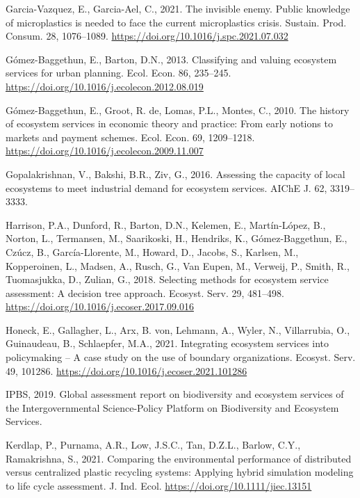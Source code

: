 \documentclass[]{elsarticle} %
\newlength{\cslhangindent}
\newenvironment{CSLReferences}[2] %
 {%
  \setlength{\parindent}{0pt}
  \ifodd #1 \everypar{\setlength{\hangindent}{\cslhangindent}}\ignorespaces\fi
  \ifnum #2 > 0
  \setlength{\parskip}{#2\baselineskip}
  \fi
 }%
 {}
\begin{document}
\begin{CSLReferences}{1}{0}
\leavevmode{}%
Garcia-Vazquez, E., Garcia-Ael, C., 2021. {The invisible enemy. Public knowledge of microplastics is needed to face the current microplastics crisis}. Sustain. Prod. Consum. 28, 1076--1089. \url{https://doi.org/10.1016/j.spc.2021.07.032}

\leavevmode{}%
Gómez-Baggethun, E., Barton, D.N., 2013. {Classifying and valuing ecosystem services for urban planning}. Ecol. Econ. 86, 235--245. \url{https://doi.org/10.1016/j.ecolecon.2012.08.019}

\leavevmode{}%
Gómez-Baggethun, E., Groot, R. de, Lomas, P.L., Montes, C., 2010. {The history of ecosystem services in economic theory and practice: From early notions to markets and payment schemes}. Ecol. Econ. 69, 1209--1218. \url{https://doi.org/10.1016/j.ecolecon.2009.11.007}

\leavevmode{}%
Gopalakrishnan, V., Bakshi, B.R., Ziv, G., 2016. {Assessing the capacity of local ecosystems to meet industrial demand for ecosystem services}. AIChE J. 62, 3319--3333.

\leavevmode{}%
Harrison, P.A., Dunford, R., Barton, D.N., Kelemen, E., Martín-López, B., Norton, L., Termansen, M., Saarikoski, H., Hendriks, K., Gómez-Baggethun, E., Czúcz, B., García-Llorente, M., Howard, D., Jacobs, S., Karlsen, M., Kopperoinen, L., Madsen, A., Rusch, G., Van Eupen, M., Verweij, P., Smith, R., Tuomasjukka, D., Zulian, G., 2018. {Selecting methods for ecosystem service assessment: A decision tree approach}. Ecosyst. Serv. 29, 481--498. \url{https://doi.org/10.1016/j.ecoser.2017.09.016}

\leavevmode{}%
Honeck, E., Gallagher, L., Arx, B. von, Lehmann, A., Wyler, N., Villarrubia, O., Guinaudeau, B., Schlaepfer, M.A., 2021. {Integrating ecosystem services into policymaking -- A case study on the use of boundary organizations}. Ecosyst. Serv. 49, 101286. \url{https://doi.org/10.1016/j.ecoser.2021.101286}

\leavevmode{}%
IPBS, 2019. {Global assessment report on biodiversity and ecosystem services of the Intergovernmental Science-Policy Platform on Biodiversity and Ecosystem Services}.

\leavevmode{}%
Kerdlap, P., Purnama, A.R., Low, J.S.C., Tan, D.Z.L., Barlow, C.Y., Ramakrishna, S., 2021. {Comparing the environmental performance of distributed versus centralized plastic recycling systems: Applying hybrid simulation modeling to life cycle assessment}. J. Ind. Ecol. \url{https://doi.org/10.1111/jiec.13151}


\end{CSLReferences}
\end{document}
